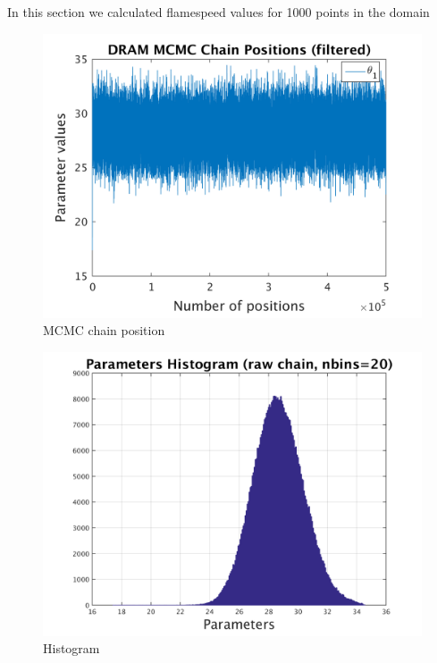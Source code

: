 In this section we calculated flamespeed values for 1000 points in the domain 

\begin{figure}[H]
  
  \centering
   \includegraphics[scale=0.75]{53_results/output_1000/simple_ip_chain_pos_filt}
   \caption{MCMC chain position }
\end{figure}


\begin{figure}[H]
  
  \centering
   \includegraphics[scale=0.75]{53_results/output_1000/simple_ip_hist_raw}
   \caption{Histogram}
\end{figure}



